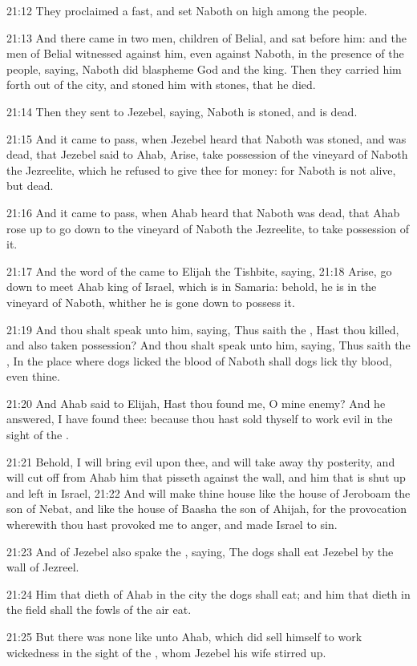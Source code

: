 21:12 They proclaimed a fast, and set Naboth on high among the people.

21:13 And there came in two men, children of Belial, and sat before him: and the men of Belial witnessed against him, even against Naboth, in the presence of the people, saying, Naboth did blaspheme God and the king. Then they carried him forth out of the city, and stoned him with stones, that he died.

21:14 Then they sent to Jezebel, saying, Naboth is stoned, and is dead.

21:15 And it came to pass, when Jezebel heard that Naboth was stoned, and was dead, that Jezebel said to Ahab, Arise, take possession of the vineyard of Naboth the Jezreelite, which he refused to give thee for money: for Naboth is not alive, but dead.

21:16 And it came to pass, when Ahab heard that Naboth was dead, that Ahab rose up to go down to the vineyard of Naboth the Jezreelite, to take possession of it.

21:17 And the word of the \LORD came to Elijah the Tishbite, saying, 21:18 Arise, go down to meet Ahab king of Israel, which is in Samaria: behold, he is in the vineyard of Naboth, whither he is gone down to possess it.

21:19 And thou shalt speak unto him, saying, Thus saith the \LORD, Hast thou killed, and also taken possession? And thou shalt speak unto him, saying, Thus saith the \LORD, In the place where dogs licked the blood of Naboth shall dogs lick thy blood, even thine.

21:20 And Ahab said to Elijah, Hast thou found me, O mine enemy? And he answered, I have found thee: because thou hast sold thyself to work evil in the sight of the \LORD.

21:21 Behold, I will bring evil upon thee, and will take away thy posterity, and will cut off from Ahab him that pisseth against the wall, and him that is shut up and left in Israel, 21:22 And will make thine house like the house of Jeroboam the son of Nebat, and like the house of Baasha the son of Ahijah, for the provocation wherewith thou hast provoked me to anger, and made Israel to sin.

21:23 And of Jezebel also spake the \LORD, saying, The dogs shall eat Jezebel by the wall of Jezreel.

21:24 Him that dieth of Ahab in the city the dogs shall eat; and him that dieth in the field shall the fowls of the air eat.

21:25 But there was none like unto Ahab, which did sell himself to work wickedness in the sight of the \LORD, whom Jezebel his wife stirred up.

